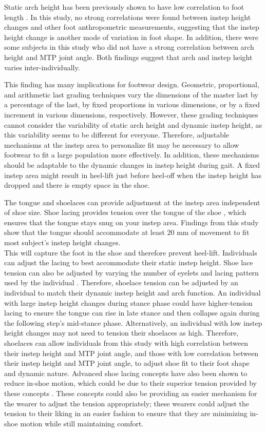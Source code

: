 \documentclass[defaultstyle,11pt]{thesis}
\begin{document}
Static arch height has been previously shown to have low correlation to foot length \citep{Hill2017}.
In this study, no strong correlations were found between instep height changes and other foot anthropometric measurements, suggesting that the instep height change is another mode of variation in foot shape.
In addition, there were some subjects in this study who did not have a strong correlation between arch height and MTP joint angle.
Both findings suggest that arch and instep height varies inter-individually.

This finding has many implications for footwear design. Geometric, proportional, and arithmetic last grading techniques vary the dimensions of the master last by a percentage of the last, by fixed proportions in various dimensions, or by a fixed increment in various dimensions, respectively.
However, these grading techniques cannot consider the variability of static arch height and dynamic instep height, as this variability seems to be different for everyone.
Therefore, adjustable mechanisms at the instep area to personalize fit may be necessary to allow footwear to fit a large population more effectively.
In addition, these mechanisms should be adaptable to the dynamic changes in instep height during gait.
A fixed instep area might result in heel-lift just before heel-off when the instep height has dropped and there is empty space in the shoe.

The tongue and shoelaces can provide adjustment at the instep area independent of shoe size.
Shoe lacing provides tension over the tongue of the shoe \citep{Hagen2009, Polster2002}, which ensures that the tongue stays snug on your instep area.
Findings from this study show that the tongue should accommodate at least 20 mm of movement to fit most subject's instep height changes.\\
This will capture the foot in the shoe and therefore prevent heel-lift.
Individuals can adjust the lacing to best accommodate their static instep height.
Shoe lace tension can also be adjusted by varying the number of eyelets and lacing pattern used by the individual \citep{Hagen2009, Hagen2010}.
Therefore, shoelace tension can be adjusted by an individual to match their dynamic instep height and arch function.
An individual with large instep height changes during stance phase could have higher-tension lacing to ensure the tongue can rise in late stance and then collapse again during the following step's mid-stance phase.
Alternatively, an individual with low instep height changes may not need to tension their shoelaces as high.
Therefore, shoelaces can allow individuals from this study with high correlation between their instep height and MTP joint angle, and those with low correlation between their instep height and MTP joint angle, to adjust shoe fit to their foot shape and dynamic nature.
Advanced shoe lacing concepts have also been shown to reduce in-shoe motion, which could be due to their superior tension provided by these concepts \citep{Pryhoda2021, Myers2019}.
These concepts could also be providing an easier mechanism for the wearer to adjust the tension appropriately; these wearers could adjust the tension to their liking in an easier fashion to ensure that they are minimizing in-shoe motion while still maintaining comfort.
\end{document}
